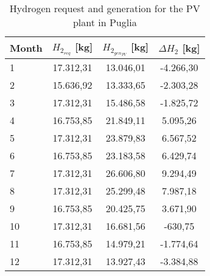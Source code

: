 \begin{table}[hp]
\centering
\begin{tabular}{|l|c|c|c|}
\hline
\rowcolor{bluepoli!40} \textbf{Month} & \multicolumn{1}{l|}{\textbf{$H_{2_{req}}$   [kg]}} & \multicolumn{1}{l|}{\textbf{$H_{2_{gen_{PV}}}$ [kg]}} & \multicolumn{1}{l|}{\textbf{$\Delta H_2$ [kg]}} \\ \hline
1  & 17.312,31     & 13.046,01     & -4.266,30 \\ \hline
2  & 15.636,92     & 13.333,65     & -2.303,28 \\ \hline
3  & 17.312,31     & 15.486,58     & -1.825,72 \\ \hline
4  & 16.753,85     & 21.849,11     & 5.095,26  \\ \hline
5  & 17.312,31     & 23.879,83     & 6.567,52  \\ \hline
6  & 16.753,85     & 23.183,58     & 6.429,74  \\ \hline
7  & 17.312,31     & 26.606,80     & 9.294,49  \\ \hline
8  & 17.312,31     & 25.299,48     & 7.987,18  \\ \hline
9  & 16.753,85     & 20.425,75     & 3.671,90  \\ \hline
10 & 17.312,31     & 16.681,56     & -630,75   \\ \hline
11 & 16.753,85     & 14.979,21     & -1.774,64 \\ \hline
12 & 17.312,31     & 13.927,43     & -3.384,88 \\ \hline
\end{tabular}
\caption{Hydrogen request and generation for the PV plant in Puglia}
\label{tab:hydrogenpuglia}
\end{table}